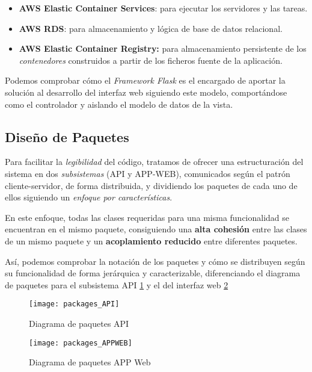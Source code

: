 \begin{itemize}
    \item \textbf{AWS Elastic Container Services}: para ejecutar los servidores y las tareas.
    \item \textbf{AWS RDS}: para almacenamiento y lógica de base de datos relacional.
    \item \textbf{AWS Elastic Container Registry:} para almacenamiento persistente de los \textit{contenedores} construidos a partir de los ficheros fuente de la aplicación.
\end{itemize}


Podemos comprobar cómo el \textit{Framework Flask} es el encargado de aportar la solución al desarrollo del interfaz web siguiendo este modelo, comportándose como el controlador y aislando el modelo de datos de la vista.

\subsection{Diseño de Paquetes}

Para facilitar la \textit{legibilidad} del código, tratamos de ofrecer una estructuración del sistema en dos \textit{subsistemas} (API y APP-WEB), comunicados según el patrón cliente-servidor, de forma distribuida, y dividiendo los paquetes de cada uno de ellos siguiendo un \textit{enfoque por características}.

En este enfoque, todas las clases requeridas para una misma funcionalidad se encuentran en el mismo paquete, consiguiendo una \textbf{alta cohesión} entre las clases de un mismo paquete y un \textbf{acoplamiento reducido} entre diferentes paquetes.

Así, podemos comprobar la notación de los paquetes y cómo se distribuyen según su funcionalidad de forma jerárquica y caracterizable, diferenciando el diagrama de paquetes para el subsistema API \ref{fig:packages_API} y el del interfaz web \ref{fig:packages_APPWEB}
\begin{landscape}
\begin{figure}
    \texttt{[image: packages\_API]}
    \caption{Diagrama de paquetes API}
    \label{fig:packages_API}
\end{figure}
\end{landscape}

\begin{landscape}
\begin{figure}
    \centering
    \texttt{[image: packages\_APPWEB]}
    \caption{Diagrama de paquetes APP Web}
    \label{fig:packages_APPWEB}
\end{figure}
\end{landscape}

